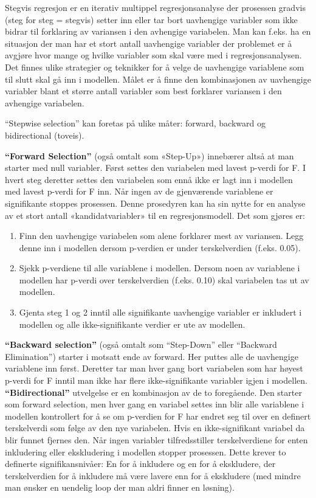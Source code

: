 \documentclass[
]{article}
\begin{document}
Stegvis regresjon er en iterativ multippel regresjonsanalyse der prosessen gradvis (steg for steg = stegvis) setter inn eller tar bort uavhengige variabler som ikke bidrar til forklaring av variansen i den avhengige variabelen. Man kan f.eks. ha en situasjon der man har et stort antall uavhengige variabler der problemet er å avgjøre hvor mange og hvilke variabler som skal være med i regresjonsanalysen. Det finnes ulike strategier og teknikker for å velge de uavhengige variablene som til slutt skal gå inn i modellen. Målet er å finne den kombinasjonen av uavhengige variabler blant et større antall variabler som best forklarer variansen i den avhengige variabelen.

``Stepwise selection'' kan foretas på ulike måter: forward, backward og bidirectional (toveis).

\textbf{``Forward Selection''} (også omtalt som «Step-Up») innebærer altså at man starter med null variabler. Først settes den variabelen med lavest p-verdi for F. I hvert steg deretter settes den variabelen som ennå ikke er lagt inn i modellen med lavest p-verdi for F inn. Når ingen av de gjenværende variablene er signifikante stoppes prosessen. Denne prosedyren kan ha sin nytte for en analyse av et stort antall «kandidatvariabler» til en regresjonsmodell. Det som gjøres er:

\begin{enumerate}
\def\labelenumi{\arabic{enumi}.}
\item
  Finn den uavhengige variabelen som alene forklarer mest av variansen. Legg denne inn i modellen dersom p-verdien er under terskelverdien (f.eks. 0.05).
\item
  Sjekk p-verdiene til alle variablene i modellen. Dersom noen av variablene i modellen har p-verdi over terskelverdien (f.eks. 0.10) skal variabelen tas ut av modellen.
\item
  Gjenta steg 1 og 2 inntil alle signifikante uavhengige variabler er inkludert i modellen og alle ikke-signifikante verdier er ute av modellen.
\end{enumerate}

\textbf{``Backward selection''} (også omtalt som ``Step-Down'' eller ``Backward Elimination'') starter i motsatt ende av forward. Her puttes alle de uavhengige variablene inn først. Deretter tar man hver gang bort variabelen som har høyest p-verdi for F inntil man ikke har flere ikke-signifikante variabler igjen i modellen.
\textbf{``Bidirectional''} utvelgelse er en kombinasjon av de to foregående. Den starter som forward selection, men hver gang en variabel settes inn blir alle variablene i modellen kontrollert for å se om p-verdien for F har endret seg til over en definert terskelverdi som følge av den nye variabelen. Hvis en ikke-signifikant variabel da blir funnet fjernes den. Når ingen variabler tilfredsstiller terskelverdiene for enten inkludering eller ekskludering i modellen stopper prosessen. Dette krever to definerte signifikansnivåer: En for å inkludere og en for å ekskludere, der terskelverdien for å inkludere må være lavere enn for å ekskludere (med mindre man ønsker en uendelig loop der man aldri finner en løsning).
\end{document}
